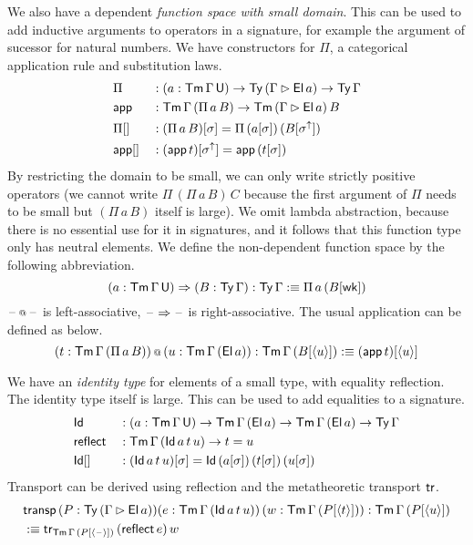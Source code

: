 \documentclass[acmsmall,review]{acmart}\settopmatter{printfolios=true,printccs=false,printacmref=false}
\begin{document}
We also have a dependent {\em function space with small domain}. This
can be used to add inductive arguments to operators in a signature,
for example the argument of sucessor for natural numbers. We have
constructors for $\Pi$, a categorical application rule and
substitution laws.
\begin{alignat*}{5}
  & \Pi && : (a:\mathsf{Tm}\,\Gamma\,\mathsf{U})\rightarrow\mathsf{Ty}\,(\Gamma\rhd\mathsf{El}\,a)\rightarrow\mathsf{Ty}\,\Gamma \\
  & \mathsf{app} && : \mathsf{Tm}\,\Gamma\,(\Pi\,a\,B)\rightarrow\mathsf{Tm}\,(\Gamma\rhd \mathsf{El}\,a)\,B \\
  & {\Pi[]} && : (\Pi\,a\,B)[\sigma] = \Pi\,(a[\sigma])\,(B[\sigma^\uparrow]) \\
  & {\mathsf{app}[]} && : (\mathsf{app}\,t)[\sigma^\uparrow] = \mathsf{app}\,(t[\sigma])
\end{alignat*}
By restricting the domain to be small, we can only write strictly
positive operators (we cannot write $\Pi\,(\Pi\,a\,B)\,C$ because the
first argument of $\Pi$ needs to be small but $(\Pi\,a\,B)$ itself is
large). We omit lambda abstraction, because there is no essential use
for it in signatures, and it follows that this function type only has
neutral elements. We define the non-dependent function space by the
following abbreviation.
\[
(a:\mathsf{Tm}\,\Gamma\,\mathsf{U})\Rightarrow(B:\mathsf{Ty}\,\Gamma) :\mathsf{Ty}\,\Gamma :\equiv \Pi\,a\,(B[\mathsf{wk}])
\]
$\mathord{\hspace{1pt}\text{--}\hspace{1pt}}\mathop{{\scriptstyle @}} \mathord{\hspace{1pt}\text{--}\hspace{1pt}}$ is left-associative, $\mathord{\hspace{1pt}\text{--}\hspace{1pt}}\Rightarrow\mathord{\hspace{1pt}\text{--}\hspace{1pt}}$ is
right-associative. The usual application can be defined as below.
\[
 (t:\mathsf{Tm}\,\Gamma\,(\Pi\,a\,B))\mathop{{\scriptstyle @}}\,(u : \mathsf{Tm}\,\Gamma\,(\mathsf{El}\,a)):\mathsf{Tm}\,\Gamma\,(B[\langle u\rangle]) :\equiv (\mathsf{app}\,t)[\langle u \rangle]
\]

We have an \emph{identity type} for elements of a small type, with
equality reflection. The identity type itself is large. This can be
used to add equalities to a signature.
\begin{alignat*}{5}
  & \mathsf{Id} && : (a:\mathsf{Tm}\,\Gamma\,\mathsf{U})\rightarrow\mathsf{Tm}\,\Gamma\,(\mathsf{El}\,a)\rightarrow\mathsf{Tm}\,\Gamma\,(\mathsf{El}\,a)\rightarrow\mathsf{Ty}\,\Gamma \\
  & \mathsf{reflect} && : \mathsf{Tm}\,\Gamma\,(\mathsf{Id}\,a\,t\,u)\rightarrow t = u \\
  & {\mathsf{Id}[]} && : (\mathsf{Id}\,a\,t\,u)[\sigma] = \mathsf{Id}\,(a[\sigma])\,(t[\sigma])\,(u[\sigma])
\end{alignat*}
Transport can be derived using reflection and the metatheoretic
transport $\mathsf{tr}$.
\begin{alignat*}{5}
  & \mathsf{transp}\,(P : \mathsf{Ty}\,(\Gamma \rhd \mathsf{El}\,a))(e:\mathsf{Tm}\,\Gamma\,(\mathsf{Id}\,a\,t\,u))\,(w:\mathsf{Tm}\,\Gamma\,(P[\langle t \rangle])):\mathsf{Tm}\,\Gamma\,(P[\langle u \rangle]) \\
  & :\equiv \mathsf{tr}_{\mathsf{Tm}\,\Gamma\,(P[\langle\mathord{\hspace{1pt}\text{--}\hspace{1pt}}\rangle])}\,(\mathsf{reflect}\,e)\,w
\end{alignat*}
\end{document}
